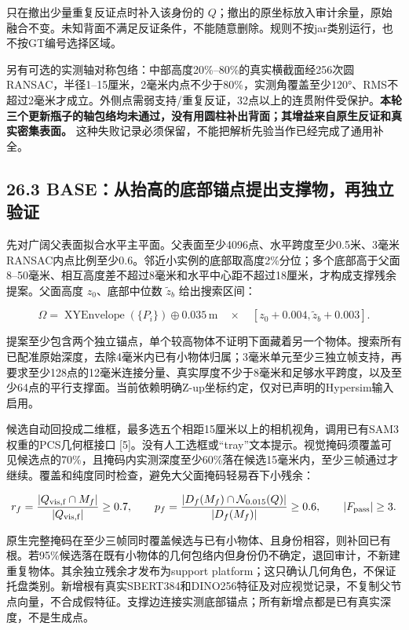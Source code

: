 \documentclass[UTF8,fontset=fandol]{ctexart}
\begin{document}
只在撤出少量重复反证点时补入该身份的 $Q$；撤出的原坐标放入审计余量，原始融合不变。未知背面不满足反证条件，不能随意删除。规则不按jar类别运行，也不按GT编号选择区域。



另有可选的实测轴对称包络：中部高度20\%–80\%的真实横截面经256次圆RANSAC，半径1–15厘米，2毫米内点不少于80\%，实测角覆盖至少120°、RMS不超过2毫米才成立。外侧点需弱支持/重复反证，32点以上的连贯附件受保护。\textbf{本轮三个更新瓶子的轴包络均未通过，没有用圆柱补出背面；其增益来自原生反证和真实密集表面。} 这种失败记录必须保留，不能把解析先验当作已经完成了通用补全。



\subsection*{26.3 BASE：从抬高的底部锚点提出支撑物，再独立验证}

先对广阔父表面拟合水平主平面。父表面至少4096点、水平跨度至少0.5米、3毫米RANSAC内点比例至少0.6。邻近小实例的底部取高度2\%分位；多个底部高于父面8–50毫米、相互高度差不超过8毫米和水平中心距不超过18厘米，才构成支撑残余提案。父面高度 $z_0$、底部中位数 $\widetilde z_b$ 给出搜索区间：



\[
\Omega=\operatorname{XYEnvelope}(\{P_i\})\oplus0.035\,\mathrm m\quad\times\quad[z_0+0.004,\widetilde z_b+0.003].
\]

提案至少包含两个独立锚点，单个较高物体不证明下面藏着另一个物体。搜索所有已配准原始深度，去除4毫米内已有小物体归属；3毫米单元至少三独立帧支持，再要求至少128点的12毫米连接分量、真实厚度不少于8毫米和足够水平跨度，以及至少64点的平行支撑面。当前依赖明确Z-up坐标约定，仅对已声明的Hypersim输入启用。



候选自动回投成二维框，最多选五个相距15厘米以上的相机视角，调用已有SAM3权重的PCS几何框接口 [5]。没有人工选框或“tray”文本提示。视觉掩码须覆盖可见候选点的70\%，且掩码内实测深度至少60\%落在候选15毫米内，至少三帧通过才继续。覆盖和纯度同时检查，避免大父面掩码轻易吞下小残余：



\[
r_f=\frac{|Q_{\rm vis,f}\cap M_f|}{|Q_{\rm vis,f}|}\ge0.7,\qquad
p_f=\frac{|D_f(M_f)\cap\mathcal N_{0.015}(Q)|}{|D_f(M_f)|}\ge0.6,\qquad |F_{\rm pass}|\ge3.
\]

原生完整掩码在至少三帧同时覆盖候选与已有小物体、且身份相容，则补回已有根。若95\%候选落在既有小物体的几何包络内但身份仍不确定，退回审计，不新建重复物体。其余独立残余才发布为support platform；这只确认几何角色，不保证托盘类别。新增根有真实SBERT384和DINO256特征及对应视觉记录，不复制父节点向量，不合成假特征。支撑边连接实测底部锚点；所有新增点都是已有真实深度，不是生成点。
\end{document}
